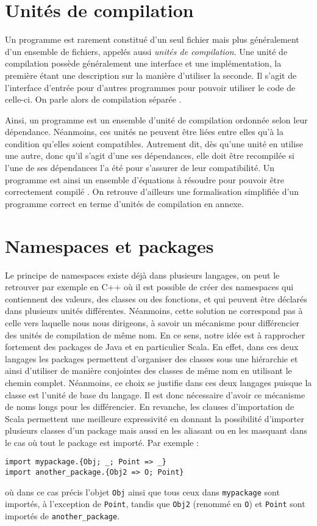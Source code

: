 \documentclass[11pt,a4paper]{report}
\begin{document}
\section{Unités de compilation}

Un programme est rarement constitué d'un seul fichier mais plus généralement
d'un ensemble de fichiers, appelés aussi \emph{unités de compilation}. Une unité
de compilation possède généralement une interface et une implémentation, la
première étant une description sur la manière d'utiliser la seconde. Il s'agit
de l'interface d'entrée pour d'autres programmes pour pouvoir utiliser le code
de celle-ci. On parle alors de compilation séparée
\cite{Cardelli97programfragments}.

Ainsi, un programme est un ensemble d'unité de compilation ordonnée selon leur
dépendance. Néanmoins, ces unités ne peuvent être liées entre elles qu'à la
condition qu'elles soient compatibles. Autrement dit, dès qu'une unité en
utilise une autre, donc qu'il s'agit d'une ses dépendances, elle doit être
recompilée si l'une de ses dépendances l'a été pour s'assurer de leur
compatibilité. Un programme est ainsi un ensemble d'équations à résoudre
pour pouvoir être correctement compilé \cite{Drossopoulou99afragment}. On
retrouve d'ailleurs une formalisation simplifiée d'un programme correct en terme
d'unités de compilation en annexe.

\section{Namespaces et packages}

Le principe de namespaces existe déjà dans plusieurs langages, on peut le
retrouver par exemple en C++\cite{cppspec} où il est possible de créer des
namespaces qui contiennent des valeurs, des classes ou des fonctions, et qui
peuvent être déclarés dans plusieurs unités différentes. Néanmoins, cette
solution ne correspond pas à celle vers laquelle nous nous dirigeons, à savoir
un mécanisme pour différencier des unités de compilation de même nom. En ce
sens, notre idée est à rapprocher fortement des packages de Java\cite{java-spec}
et en particulier Scala\cite{scalaspec}. En effet, dans ces deux langages les
packages permettent d'organiser des classes sous une hiérarchie et ainsi
d'utiliser de manière conjointes des classes de même nom en utilisant le chemin
complet. Néanmoins, ce choix se justifie dans ces deux langages puisque la 
classe est l'unité de base du langage. Il est donc nécessaire d'avoir ce
mécanisme de noms longs pour les différencier. En revanche, les clauses
d'importation de Scala permettent une meilleure expressivité en donnant la
possibilité d'importer plusieurs classes d'un package mais aussi en les aliasant
ou en les masquant dans le cas où tout le package est importé. Par exemple :
\begin{verbatim}
import mypackage.{Obj; _; Point => _}
import another_package.{Obj2 => O; Point}
\end{verbatim}
où dans ce cas précis l'objet \texttt{Obj} ainsi que tous ceux dans
\texttt{mypackage} sont importés, à l'exception de \texttt{Point}, tandis que
\texttt{Obj2} (renommé en \texttt{O}) et \texttt{Point} sont importés de
\texttt{another_package}.
\end{document}
